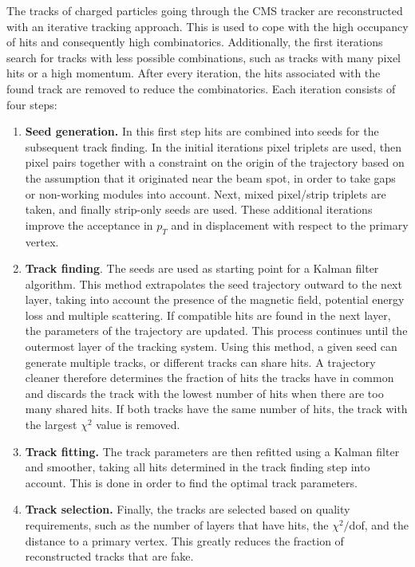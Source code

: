 The tracks of charged particles going through the \ac{CMS} tracker are reconstructed with an iterative tracking approach. This is used to cope with the high occupancy of hits and consequently high combinatorics. Additionally, the first iterations search for tracks with less possible combinations, such as tracks with many pixel hits or a high momentum. After every iteration, the hits associated with the found track are removed to reduce the combinatorics. Each iteration consists of four steps:
\begin{enumerate}
 \item \textbf{Seed generation.} In this first step hits are combined into seeds for the subsequent track finding. In the initial iterations pixel triplets are used, then pixel pairs together with a constraint on the origin of the trajectory based on the assumption that it originated near the beam spot, in order to take gaps or non-working modules into account. Next, mixed pixel/strip triplets are taken, and finally strip-only seeds are used. These additional iterations improve the acceptance in $p_T$ and in displacement with respect to the primary vertex.
 \item \textbf{Track finding}. The seeds are used as starting point for a Kalman filter algorithm. This method extrapolates the seed trajectory outward to the next layer, taking into account the presence of the magnetic field, potential energy loss and multiple scattering. If compatible hits are found in the next layer, the parameters of the trajectory are updated. This process continues until the outermost layer of the tracking system. Using this method, a given seed can generate multiple tracks, or different tracks can share hits. A trajectory cleaner therefore determines the fraction of hits the tracks have in common and discards the track with the lowest number of hits when there are too many shared hits. If both tracks have the same number of hits, the track with the largest $\chi^2$ value is removed.
 \item \textbf{Track fitting.} The track parameters are then refitted using a Kalman filter and smoother, taking all hits determined in the track finding step into account. This is done in order to find the optimal track parameters.
 \item \textbf{Track selection.} Finally, the tracks are selected based on quality requirements, such as the number of layers that have hits, the $\chi^2/$dof, and the distance to a primary vertex. This greatly reduces the fraction of reconstructed tracks that are fake.
\end{enumerate}

